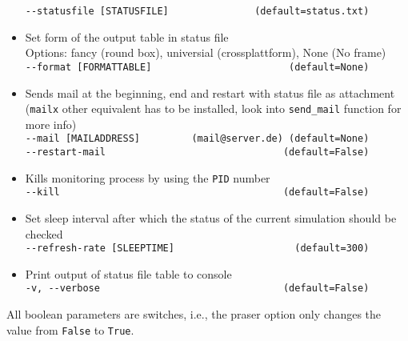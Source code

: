 \begin{itemize}
          \texttt{-\/-statusfile [STATUSFILE]~~~~~~~~~~~~~~~(default=status.txt)}
    \item Set form of the output table in status file\\
          Options: fancy (round box), universial (crossplattform), None (No frame)\\
          \texttt{-\/-format [FORMATTABLE]~~~~~~~~~~~~~~~~~~~~~~~~(default=None)}
    \item Sends mail at the beginning, end and restart with status file as attachment\\
          (\texttt{mailx} other equivalent has to be installed, look into \texttt{send\_mail} function for more info)\\
          \texttt{-\/-mail [MAILADDRESS]~~~~~~~~~(mail@server.de)~(default=None)}\\
          \texttt{-\/-restart-mail ~~~~~~~~~~~~~~~~~~~~~~~~~~~~~~(default=False)}
    \item Kills monitoring process by using the \texttt{PID} number\\
          \texttt{-\/-kill~~~~~~~~~~~~~~~~~~~~~~~~~~~~~~~~~~~~~~~(default=False)}
    \item Set sleep interval after which the status of the current simulation should be checked\\
          \texttt{-\/-refresh-rate [SLEEPTIME]~~~~~~~~~~~~~~~~~~~~~(default=300)}
    \item Print output of status file table to console\\
          \texttt{-v, -\/-verbose~~~~~~~~~~~~~~~~~~~~~~~~~~~~~~~\,(default=False)}
\end{itemize}
All boolean parameters are switches, i.e., the praser option only changes the value from \texttt{False} to \texttt{True}.

